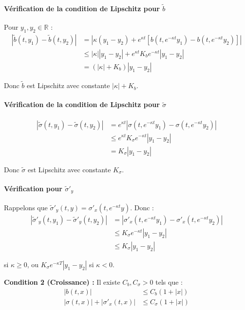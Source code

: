 \documentclass[12pt,a4paper]{article}
\theoremstyle{definition}
\theoremstyle{remark}
\newcommand{\R}{\mathbb{R}}
\begin{document}
\paragraph{Vérification de la condition de Lipschitz pour $\tilde{b}$}

Pour $y_1, y_2 \in \R$ :
\begin{align*}
|\tilde{b}(t,y_1) - \tilde{b}(t,y_2)| &= |\kappa(y_1 - y_2) + e^{\kappa t}[b(t, e^{-\kappa t}y_1) - b(t, e^{-\kappa t}y_2)]| \\
&\leq |\kappa||y_1 - y_2| + e^{\kappa t}K_b e^{-\kappa t}|y_1 - y_2| \\
&= (|\kappa| + K_b)|y_1 - y_2|
\end{align*}

Donc $\tilde{b}$ est Lipschitz avec constante $|\kappa| + K_b$.

\paragraph{Vérification de la condition de Lipschitz pour $\tilde{\sigma}$}

\begin{align*}
|\tilde{\sigma}(t,y_1) - \tilde{\sigma}(t,y_2)| &= e^{\kappa t}|\sigma(t, e^{-\kappa t}y_1) - \sigma(t, e^{-\kappa t}y_2)| \\
&\leq e^{\kappa t}K_\sigma e^{-\kappa t}|y_1 - y_2| \\
&= K_\sigma|y_1 - y_2|
\end{align*}

Donc $\tilde{\sigma}$ est Lipschitz avec constante $K_\sigma$.

\paragraph{Vérification pour $\tilde{\sigma}'_y$}

Rappelons que $\tilde{\sigma}'_y(t,y) = \sigma'_x(t, e^{-\kappa t}y)$. Donc :
\begin{align*}
|\tilde{\sigma}'_y(t,y_1) - \tilde{\sigma}'_y(t,y_2)| &= |\sigma'_x(t, e^{-\kappa t}y_1) - \sigma'_x(t, e^{-\kappa t}y_2)| \\
&\leq K_\sigma e^{-\kappa t}|y_1 - y_2|\\
&\leq K_\sigma|y_1 - y_2|
\end{align*}

si $\kappa \geq 0$, ou $K_\sigma e^{-\kappa T}|y_1 - y_2|$ si $\kappa < 0$.

\textbf{Condition 2 (Croissance) :} Il existe $C_b, C_\sigma > 0$ tels que :
\begin{align}
|b(t,x)| &\leq C_b(1 + |x|) \\
|\sigma(t,x)| + |\sigma'_x(t,x)| &\leq C_\sigma(1 + |x|)
\end{align}
\end{document}
